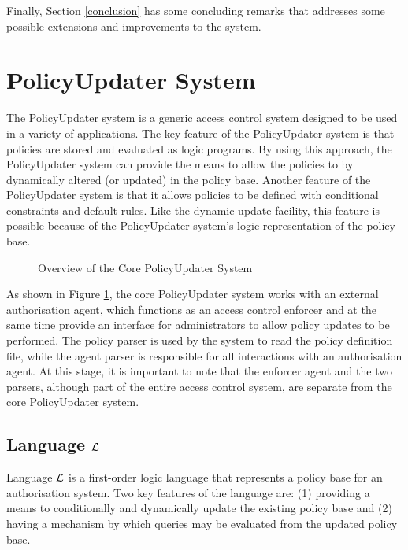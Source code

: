 \documentclass[11pt]{llncs}
\begin{document}

    Finally, Section \ref{conclusion} has some concluding remarks that
    addresses some possible extensions and improvements to the system.

  \section{PolicyUpdater System}
    \label{polupdate}

    The PolicyUpdater system is a generic access control system designed to
    be used in a variety of applications. The key feature of the PolicyUpdater
    system is that policies are stored and evaluated as logic programs. By
    using this approach, the PolicyUpdater system can provide the means to
    allow the policies to by dynamically altered (or updated) in the policy
    base. Another feature of the PolicyUpdater system is that it allows
    policies to be defined with conditional constraints and default rules. Like
    the dynamic update facility, this feature is possible because of the
    PolicyUpdater system's logic representation of the policy base.

    \begin{figure}[ht]
      \begin{center}
        \caption{Overview of the Core PolicyUpdater System}
        \label{fig-1}
      \end{center}
    \end{figure}

    As shown in Figure \ref{fig-1}, the core PolicyUpdater system works with an
    external authorisation agent, which functions as an access control enforcer
    and at the same time provide an interface for administrators to allow
    policy updates to be performed. The policy parser is used by the system to
    read the policy definition file, while the agent parser is responsible for
    all interactions with an authorisation agent. At this stage, it is
    important to note that the enforcer agent and the two parsers, although
    part of the entire access control system, are separate from the core
    PolicyUpdater system.

    \subsection{Language ${\cal L}$}
      Language $\cal{L}$ is a first-order logic language that represents a
      policy base for an authorisation system. Two key features of the
      language are: (1) providing a means to conditionally and dynamically
      update  the existing policy base and (2) having a mechanism by which
      queries may be evaluated from the updated policy base.
\end{document}
